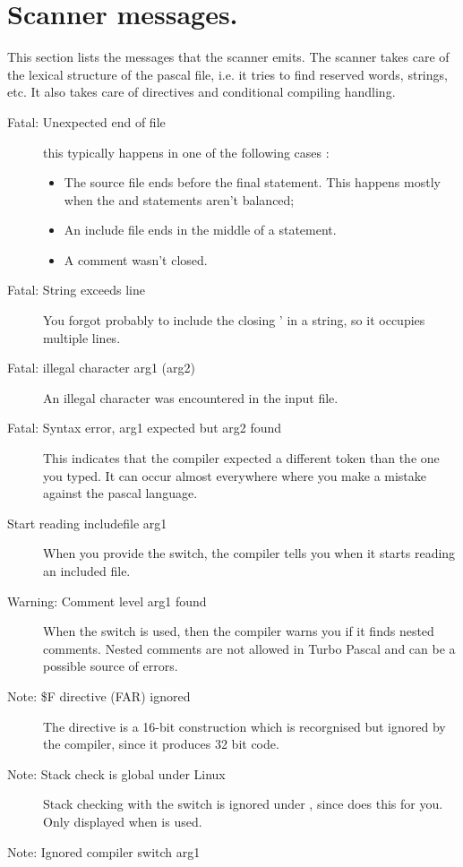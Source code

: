  \section{Scanner messages.}
 This section lists the messages that the scanner emits. The scanner takes
 care of the lexical structure of the pascal file, i.e. it tries to find
 reserved words, strings, etc. It also takes care of directives and
 conditional compiling handling.
 \begin{description}
\item [Fatal: Unexpected end of file]
 this typically happens in one of the following cases :
 \begin{itemize}
 \item The source file ends before the final  statement. This
 happens mostly when the  and  statements aren't
 balanced;
 \item An include file ends in the middle of a statement.
 \item A comment wasn't closed.
 \end{itemize}
\item [Fatal: String exceeds line]
 You forgot probably to include the closing ' in a string, so it occupies
 multiple lines.
\item [Fatal: illegal character arg1 (arg2)]
 An illegal character was encountered in the input file.
\item [Fatal: Syntax error, arg1 expected but arg2 found]
 This indicates that the compiler expected a different token than
 the one you typed. It can occur almost everywhere where you make a
 mistake against the pascal language.
\item [Start reading includefile arg1]
 When you provide the  switch, the compiler tells you
 when it starts reading an included file.
\item [Warning: Comment level arg1 found]
 When the  switch is used, then the compiler warns you if
 it finds nested comments. Nested comments are not allowed in Turbo Pascal
 and can be a possible source of errors.
\item [Note: \$F directive (FAR) ignored]
 The  directive is a 16-bit construction which is recorgnised
 but ignored by the compiler, since it produces 32 bit code.
\item [Note: Stack check is global under Linux]
 Stack checking with the  switch is ignored under \linux, since
 \linux does this for you. Only displayed when  is used.
\item [Note: Ignored compiler switch arg1]

\end{description}
